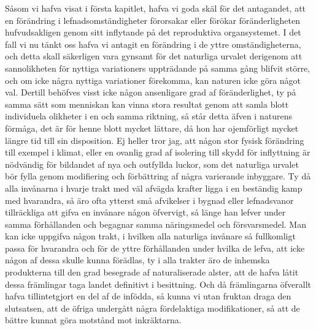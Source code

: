 Såsom vi hafva visat i första kapitlet, hafva vi goda skäl för det antagandet, att en förändring i lefnadsomständigheter förorsakar eller förökar föränderligheten hufvudsakligen genom sitt inflytande på det reproduktiva organsystemet. I det fall vi nu tänkt oss hafva vi antagit en förändring i de yttre omständigheterna, och detta skall säkerligen vara gynsamt för det naturliga urvalet derigenom att sannolikheten för nyttiga variationers uppträdande på samma gång blifvit större, och om icke några nyttiga variationer förekomma, kan naturen icke göra något val. Dertill behöfves visst icke någon ansenligare grad af föränderlighet, ty på samma sätt som menniskan kan vinna stora resultat genom att samla blott individuela olikheter i en och samma riktning, så står detta äfven i naturens förmåga, det är för henne blott mycket lättare, då hon har ojemförligt mycket längre tid till sin disposition. Ej heller tror jag, att någon stor fysisk förändring till exempel i klimat, eller en ovanlig grad af isolering till skydd för inflyttning är nödvändig för bildandet af nya och outfyllda luckor, som det naturliga urvalet bör fylla genom modifiering och förbättring af några varierande inbyggare. Ty då alla invånarna i hvarje trakt med väl afvägda krafter ligga i en beständig kamp med hvarandra, så äro ofta ytterst små afvikelser i bygnad eller lefnadsvanor tillräckliga att gifva en invånare någon öfvervigt, så länge han lefver under samma förhållanden och begagnar samma näringsmedel och försvarsmedel. Man kan icke uppgifva någon trakt, i hvilken alla naturliga invånare så fullkomligt passa för hvarandra och för de yttre förhållanden under hvilka de lefva, att icke någon af dessa skulle kunna förädlas, ty i alla trakter äro de inhemska produkterna till den grad besegrade af naturaliserade alster, att de hafva låtit dessa främlingar taga landet definitivt i besittning. Och då främlingarna öfverallt hafva tillintetgjort en del af de infödda, så kunna vi utan fruktan draga den slutsatsen, att de öfriga undergått några fördelaktiga modifikationer, så att de bättre kunnat göra motstånd mot inkräktarna.

